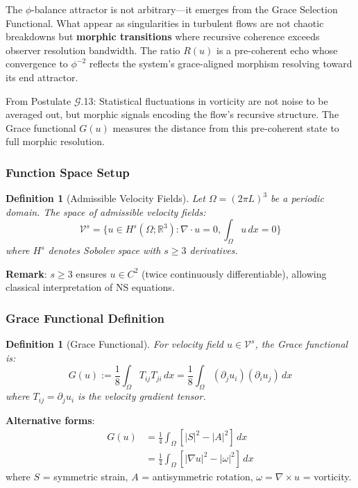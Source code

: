 \documentclass[12pt,a4paper]{article}
\newtheorem{definition}[theorem]{Definition}
\begin{document}
The $\phi$-balance attractor is not arbitrary—it emerges from the Grace Selection Functional. What appear as singularities in turbulent flows are not chaotic breakdowns but \textbf{morphic transitions} where recursive coherence exceeds observer resolution bandwidth. The ratio $R(u)$ is a pre-coherent echo whose convergence to $\phi^{-2}$ reflects the system's grace-aligned morphism resolving toward its end attractor.

From Postulate $\mathcal{G}$.13: Statistical fluctuations in vorticity are not noise to be averaged out, but morphic signals encoding the flow's recursive structure. The Grace functional $G(u)$ measures the distance from this pre-coherent state to full morphic resolution.

\subsubsection{Function Space Setup}

\begin{definition}[Admissible Velocity Fields]
Let $\Omega = (2\pi L)^3$ be a periodic domain. The space of admissible velocity fields:
\begin{equation}
\mathcal{V}^s = \{u \in H^s(\Omega;\mathbb{R}^3) : \nabla \cdot u = 0, \int_\Omega u\, dx = 0\}
\end{equation}
where $H^s$ denotes Sobolev space with $s \geq 3$ derivatives.
\end{definition}

\textbf{Remark}: $s \geq 3$ ensures $u \in C^2$ (twice continuously differentiable), allowing classical interpretation of NS equations.

\subsubsection{Grace Functional Definition}

\begin{definition}[Grace Functional]
For velocity field $u \in \mathcal{V}^s$, the Grace functional is:
\begin{equation}
G(u) := \frac{1}{8} \int_\Omega T_{ij} T_{ji}\, dx = \frac{1}{8} \int_\Omega (\partial_j u_i)(\partial_i u_j)\, dx
\end{equation}
where $T_{ij} = \partial_j u_i$ is the velocity gradient tensor.
\end{definition}

\textbf{Alternative forms}:
\begin{align}
G(u) &= \frac{1}{4} \int_\Omega [|S|^2 - |A|^2]\, dx \\
&= \frac{1}{4} \int_\Omega [|\nabla u|^2 - |\omega|^2]\, dx
\end{align}
where $S$ = symmetric strain, $A$ = antisymmetric rotation, $\omega = \nabla \times u$ = vorticity.
\end{document}

